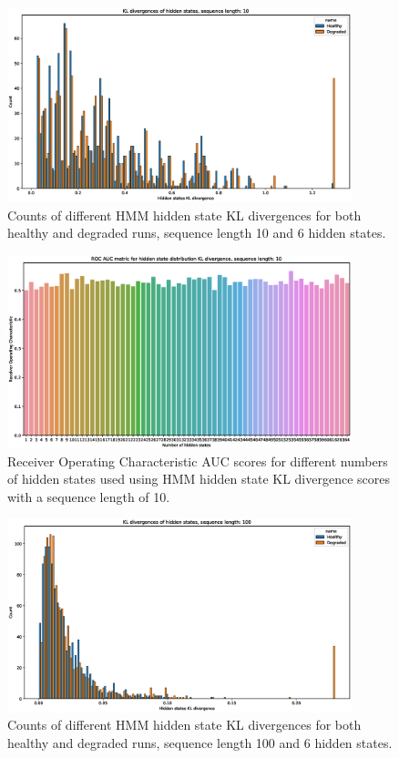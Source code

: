 \documentclass[journal]{IEEEtran}
\begin{document}
\begin{figure}[tb]
 \centering
 \includegraphics[width=10cm,keepaspectratio=true]{./kl_histograms_10.eps}
 \caption{Counts of different HMM hidden state KL divergences for both healthy and degraded runs, sequence length 10 and 6 hidden states.}
 \label{figure:kl_10}
\end{figure}

\begin{figure}[tb]
 \centering
 \includegraphics[width=10cm,keepaspectratio=true]{./roc_kl_score_10.eps}
 \caption{Receiver Operating Characteristic AUC scores for different numbers of hidden states used using HMM hidden state KL divergence scores with a sequence length of 10.}
 \label{figure:roc_kl_10}
\end{figure}

\begin{figure}[tb]
 \centering
 \includegraphics[width=10cm,keepaspectratio=true]{./kl_histograms_100.eps}
 \caption{Counts of different HMM hidden state KL divergences for both healthy and degraded runs, sequence length 100 and 6 hidden states.}
 \label{figure:kl_100}
\end{figure}
\end{document}
